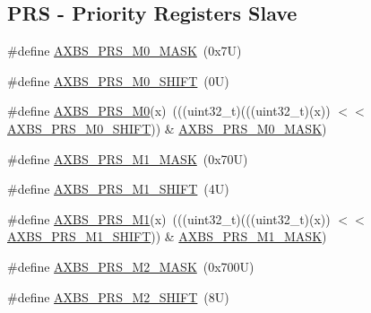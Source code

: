 \subsection*{P\+RS -\/ Priority Registers Slave}
\begin{DoxyCompactItemize}
\item 
\#define \mbox{\hyperlink{group___a_x_b_s___register___masks_ga9e794f0ace10f0e077a92ce9f5abbb41}{A\+X\+B\+S\+\_\+\+P\+R\+S\+\_\+\+M0\+\_\+\+M\+A\+SK}}~(0x7\+U)
\item 
\#define \mbox{\hyperlink{group___a_x_b_s___register___masks_ga86a8f40f6a5d45cd4868dce4833a17d5}{A\+X\+B\+S\+\_\+\+P\+R\+S\+\_\+\+M0\+\_\+\+S\+H\+I\+FT}}~(0\+U)
\item 
\#define \mbox{\hyperlink{group___a_x_b_s___register___masks_ga86a3b0cbbb03cc09f4b0b1e367219509}{A\+X\+B\+S\+\_\+\+P\+R\+S\+\_\+\+M0}}(x)~(((uint32\+\_\+t)(((uint32\+\_\+t)(x)) $<$$<$ \mbox{\hyperlink{group___a_x_b_s___register___masks_ga86a8f40f6a5d45cd4868dce4833a17d5}{A\+X\+B\+S\+\_\+\+P\+R\+S\+\_\+\+M0\+\_\+\+S\+H\+I\+FT}})) \& \mbox{\hyperlink{group___a_x_b_s___register___masks_ga9e794f0ace10f0e077a92ce9f5abbb41}{A\+X\+B\+S\+\_\+\+P\+R\+S\+\_\+\+M0\+\_\+\+M\+A\+SK}})
\item 
\#define \mbox{\hyperlink{group___a_x_b_s___register___masks_ga69131fbb37b2a3eef0e0f135e265e1c0}{A\+X\+B\+S\+\_\+\+P\+R\+S\+\_\+\+M1\+\_\+\+M\+A\+SK}}~(0x70\+U)
\item 
\#define \mbox{\hyperlink{group___a_x_b_s___register___masks_gab293a628aa64a93c04ba49fd27326592}{A\+X\+B\+S\+\_\+\+P\+R\+S\+\_\+\+M1\+\_\+\+S\+H\+I\+FT}}~(4\+U)
\item 
\#define \mbox{\hyperlink{group___a_x_b_s___register___masks_gac31344f54ce2464ad6f8fef404561b80}{A\+X\+B\+S\+\_\+\+P\+R\+S\+\_\+\+M1}}(x)~(((uint32\+\_\+t)(((uint32\+\_\+t)(x)) $<$$<$ \mbox{\hyperlink{group___a_x_b_s___register___masks_gab293a628aa64a93c04ba49fd27326592}{A\+X\+B\+S\+\_\+\+P\+R\+S\+\_\+\+M1\+\_\+\+S\+H\+I\+FT}})) \& \mbox{\hyperlink{group___a_x_b_s___register___masks_ga69131fbb37b2a3eef0e0f135e265e1c0}{A\+X\+B\+S\+\_\+\+P\+R\+S\+\_\+\+M1\+\_\+\+M\+A\+SK}})
\item 
\#define \mbox{\hyperlink{group___a_x_b_s___register___masks_gacd2feac8facc9d0b21f438eef172fd81}{A\+X\+B\+S\+\_\+\+P\+R\+S\+\_\+\+M2\+\_\+\+M\+A\+SK}}~(0x700\+U)
\item 
\#define \mbox{\hyperlink{group___a_x_b_s___register___masks_gacf78955a5852e31c71c1542d873df6b3}{A\+X\+B\+S\+\_\+\+P\+R\+S\+\_\+\+M2\+\_\+\+S\+H\+I\+FT}}~(8\+U)
\item 

\end{DoxyCompactItemize}
